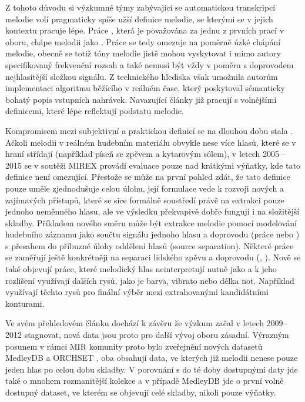 Z tohoto důvodu si výzkumné týmy zabývající se automatickou transkripcí melodie volí pragmaticky spíše užší definice melodie, se kterými se v jejich kontextu pracuje lépe. Práce \cite{Goto1999}, která je považována za jednu z prvních prací v oboru, chápe melodii jako . Práce se tedy omezuje na poměrně úzké chápání melodie, obecně se totiž tóny melodie jistě mohou vyskytovat i mimo autory specifikovaný frekvenční rozsah a také nemusí být vždy v poměru s doprovodem nejhlasitější složkou signálu. Z technického hlediska však umožnila autorům implementaci algoritmu běžícího v reálném čase, který poskytoval sémanticky bohatý popis vstupních nahrávek. Navazující články již pracují s volnějšími definicemi, které lépe reflektují podstatu melodie. 

Kompromisem mezi subjektivní a praktickou definicí se na dlouhou dobu stala . Ačkoli melodii v reálném hudebním materiálu obvykle nese více hlasů, které se v hraní střídají (například píseň se zpěvem a kytarovým sólem), v letech 2005 -- 2015 se v soutěži MIREX provádí evaluace pouze nad krátkými výňatky, kde tato definice není omezující. Přestože se může na první pohled zdát, že tato definice pouze uměle zjednodušuje celou úlohu, její formulace vede k rozvoji nových a zajímavých přístupů, které se sice formálně soustředí právě na extrakci pouze jednoho neměnného hlasu, ale ve výsledku překvapivě dobře fungují i na složitější skladby. Příkladem nového směru může být extrakce melodie pomocí modelování hudebního záznamu jako součtu signálu jednoho hlasu a doprovodu (práce \cite{Durrieu2010} nebo \cite{Bosch2016b}) s přesahem do příbuzné úlohy oddělení hlasů (source separation). Některé práce se zaměřují ještě konkrétněji na separaci lidského zpěvu a doprovodu (\cite{Hsu2010}, \cite{Ikemiya2016}). Nově se také objevují práce, které  melodický hlas neinterpretují nutně jako  a k jeho rozlišení využívají dalších rysů, jako je barva, vibrato nebo délka not. Například \cite{Salamon2012a} využívají těchto rysů pro finální výběr mezi extrahovanými kandidátními konturami.

Ve svém přehledovém článku \cite{Salamon2014} dochází k závěru že výzkum začal v letech 2009--2012 stagnovat, nová data jsou proto pro další vývoj oboru zásadní. Výrazným posunem v rámci MIR komunity proto bylo zveřejnění nových datasetů MedleyDB \citep{Bittner2014} a ORCHSET \citep{Bosch2016}, oba obsahují data, ve kterých již melodii nenese pouze jeden hlas po celou dobu skladby. V porovnání s do té doby dostupnými daty jde také o mnohem rozmanitější kolekce a v případě MedleyDB jde o první volně dostupný dataset, ve kterém se objevují celé skladby, nikoli pouze výňatky.


